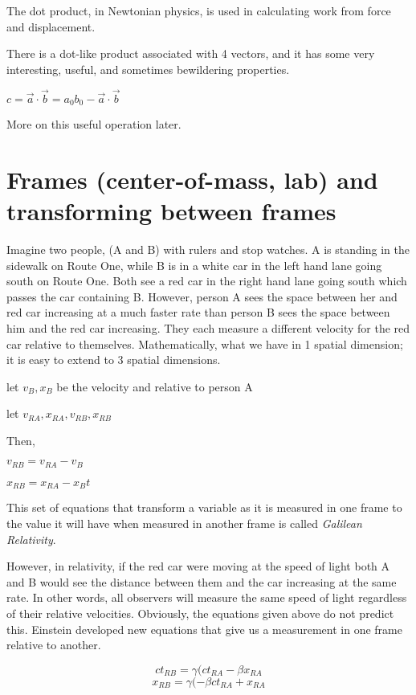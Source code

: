 \noindent The dot product, in Newtonian physics, is used in calculating work from force and displacement.

There is a dot-like product associated with 4 vectors, and it has some very interesting, useful, and sometimes bewildering properties.

	    $c = \vec a \cdot \vec b = a_0b_0 - \vec a \cdot \vec b$

More on this useful operation later.

\section{Frames (center-of-mass, lab) and transforming between frames}

Imagine two people, (A and B) with rulers and stop watches.  A is standing in the sidewalk on Route One, while B is in a white car in the left hand lane going south on Route One.  Both see a red car in the right hand lane going south which passes the car containing B.  However, person A sees the space between her and red car increasing at a much faster rate than person B sees the space between him and the red car increasing.  They each measure a different velocity for the red car relative to themselves.  Mathematically, what we have in 1 spatial dimension; it is easy to extend to 3 spatial dimensions.

\noindent let $v_B, x_B$ be the velocity and relative to person A 
       
\noindent let $v_{RA}, x_{RA},v_{RB}, x_{RB}$
	  

Then,

 $v_{RB} = v_{RA} - v_B$

 $x_{RB} = x_{RA} - x_B t$


\noindent This set of equations that transform a variable as it is measured in one frame to the value it will have when measured in another frame is called {\it Galilean Relativity}.


However, in relativity, if the red car were moving at the speed of light both A and B would see the distance between them and the car increasing at the same rate.  In other words, all observers will measure the same speed of light regardless of their relative velocities.  Obviously, the equations given above do not predict this.  Einstein developed new equations that give us a measurement in one frame relative to another.  


\begin{equation} ct_{RB} = \gamma(ct_{RA} - \beta x_{RA} \end{equation} 
\begin{equation}  x_{RB} = \gamma(- \beta ct_{RA} + x_{RA} 	 \end{equation} 

